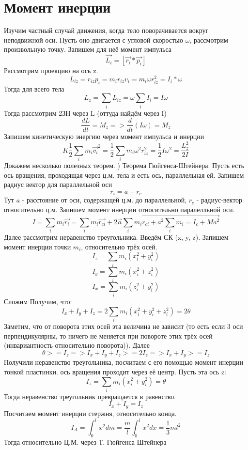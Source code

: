 \section{Момент инерции}
Изучим частный случай движения, когда тело поворачивается вокруг неподвижной оси.
    Пусть оно двигается с угловой скоростью $\omega$, рассмотрим произвольную точку.
    Запишем для неё момент импульса
    \[\Vec{L_i} = [\Vec{r_i} * \Vec{p_i}]\]
    Рассмотрим проекцию на ось z.
    \[L_{iz} = r_{iz}p_i = m_ir_{iz}v_i = m_i \omega r_{iz}^2 = I_i * \omega\]
    Тогда для всего тела
    \[L_z = \sum_i L_{iz} = \omega \sum_i I_i = I\omega\]
    Тогда рассмотрим 2ЗН через L (оттуда найдём через I)
    \[\frac{dL}{dt} = M_z => \frac{d}{dt}(I\omega) = M_z\]
    Запишем кинетическую энергию через момент импульса и инерции
    \[K \frac{1}{2}\sum_im_i\Vec{v_i}^2 = \frac{1}{2}\sum_i m_i \omega^2 r_{iz}^2 = \frac{1}{2}I\omega^2 = \frac{L_z^2}{2I}\]
    Докажем несколько полезных теорем.
    ) Теорема Гюйгенса-Штейнера.
    Пусть есть ось вращения, проходящая через ц.м. тела и есть ось, параллельная ей.
    Запишем радиус вектор для параллельной оси
    \[r_i = a + r_c\]
    Тут $a$ - расстояние от оси, содержащей ц.м. до параллельной, $r_c$ - радиус-вектор относительно ц.м.
    Запишем момент инерции относительно паралелльной оси.
    \[I = \sum_i m_i \Vec{r_i} = \sum_i m_i \Vec{r_{ci}} + 2\Vec{a} \sum_i m_i \Vec{r_{ci} + a^2\sum_i m_i = I_c + Ma^2}\]
    Далее рассмотрим неравенство треугольника.
    Введём СК (x, y, z).
    Запишем момент инерции точки $m_i$, относительно трёх осей.
    \[I_z = \sum_i m_i (x_i^2 + y_i^2)\]
    \[I_y = \sum_i m_i (x_i^2 + z_i^2)\]
    \[I_x = \sum_i m_i (z_i^2 + y_i^2)\]
    Сложим
    Получим, что:
    \[I_x + I_y + I_z = 2\sum_i m_i (x_i^2 + y_i^2 + z_i^2) = 2\theta\]
    Заметим, что от поворота этих осей эта величина не зависит (то есть если 3 оси перпендикулярны, то ничего не меняется при повороте этих трёх осей (инвариантность относительно поворота)).
    Далее
    \[\theta >= I_z => I_x + I_y + I_z >= 2 I_z => I_x + I_y >= I_z\]
    Получили неравенство треугольника, посчитаем с его помощью момент инерции тонкой пластинки.
    ось вращения проходит через её центр.
    Пусть эта ось z:
    \[I_z = \sum_i m_i (x_i^2 + y_i^2) = \theta\]
    Тогда неравенство треугольник превращается в равенство.
    \[I_x + I_y = I_z\]
    Посчитаем момент инерции стержня, относительно конца.
    \[I_A = \int_0^l x^2dm = \frac{m}{l}\int_0^l x^2dx = \frac{1}{3}ml^2\]
    Тогда относительно Ц.М. через Т. Гюйгенса-Штейнера

